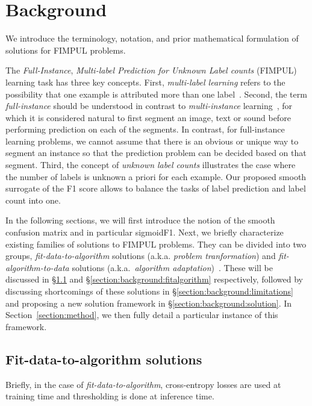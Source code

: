 
\section{Background}
\label{section:background}

We introduce the terminology, notation, and prior mathematical formulation of solutions for FIMPUL problems.

The \emph{Full-Instance}, \emph{Multi-label Prediction for Unknown Label counts} (FIMPUL) learning task has three key concepts.
First, \emph{multi-label learning} refers to the possibility that one example is attributed more than one label~\cite{multilabelMethods}.
Second, the term \emph{full-instance} should be understood in contrast to \emph{multi-instance} learning~\citep[e.g.,][]{multiInstance,multiInstanceMultiLabel}, for which it is considered natural to first segment an image, text or sound before performing prediction on each of the segments. In contrast, for full-instance learning problems, we cannot assume that there is an obvious or unique way to segment an instance so that the prediction problem can be decided based on that segment.
Third, the concept of \emph{unknown label counts} illustrates the case where the number of labels is unknown a priori for each example. Our proposed smooth surrogate of the F1 score allows to balance the tasks of label prediction and label count into one.

In the following sections, we will first introduce the notion of the smooth confusion matrix and in particular sigmoidF1.
Next, we briefly characterize existing families of solutions to FIMPUL problems.
They can be divided into two groups, \emph{fit-data-to-algorithm} solutions (a.k.a. \emph{problem tranformation}) and \emph{fit-algorithm-to-data} solutions (a.k.a.\ \emph{algorithm adaptation})~\cite{multilabelReview, multilabelReview2}. These will be discussed in \S\ref{section:background:fitdata} and \S\ref{section:background:fitalgorithm} respectively, followed by discussing shortcomings of these solutions in \S\ref{section:background:limitations} and proposing a new solution framework in \S\ref{section:background:solution}.
In Section~\ref{section:method}, we then fully detail a particular instance of this framework.

\subsection{Fit-data-to-algorithm solutions} 
\label{section:background:fitdata}
Briefly, in the case of \emph{fit-data-to-algorithm}, cross-entropy losses are used at training time and thresholding is done at inference time. 

